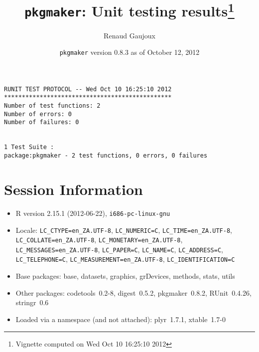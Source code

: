 \documentclass[10pt]{article}
\author{Renaud Gaujoux}
\title{\texttt{pkgmaker}: Unit testing results\footnote{Vignette computed  on Wed Oct 10 16:25:10 2012}}
\date{\texttt{pkgmaker} version 0.8.3 as of October 12, 2012}
\begin{document}
\maketitle

\begin{verbatim}
RUNIT TEST PROTOCOL -- Wed Oct 10 16:25:10 2012 
*********************************************** 
Number of test functions: 2 
Number of errors: 0 
Number of failures: 0 

 
1 Test Suite : 
package:pkgmaker - 2 test functions, 0 errors, 0 failures
\end{verbatim}

\section*{Session Information}
\begin{itemize}\raggedright
  \item R version 2.15.1 (2012-06-22), \verb|i686-pc-linux-gnu|
  \item Locale: \verb|LC_CTYPE=en_ZA.UTF-8|, \verb|LC_NUMERIC=C|, \verb|LC_TIME=en_ZA.UTF-8|, \verb|LC_COLLATE=en_ZA.UTF-8|, \verb|LC_MONETARY=en_ZA.UTF-8|, \verb|LC_MESSAGES=en_ZA.UTF-8|, \verb|LC_PAPER=C|, \verb|LC_NAME=C|, \verb|LC_ADDRESS=C|, \verb|LC_TELEPHONE=C|, \verb|LC_MEASUREMENT=en_ZA.UTF-8|, \verb|LC_IDENTIFICATION=C|
  \item Base packages: base, datasets, graphics, grDevices, methods,
    stats, utils
  \item Other packages: codetools~0.2-8, digest~0.5.2, pkgmaker~0.8.2,
    RUnit~0.4.26, stringr~0.6
  \item Loaded via a namespace (and not attached): plyr~1.7.1,
    xtable~1.7-0
\end{itemize}
\end{document}
